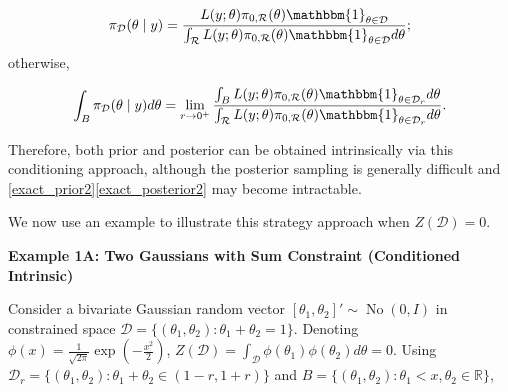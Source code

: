\documentclass[10pt]{article}
\newcommand{\mc}[1]{\mathcal{#1}}
\DeclareMathOperator{\No}{No}
\DeclareMathOperator{\1}{\mathbbm{1}}
\begin{document}
\begin{equation}
\label{exact_posterior1}
	{\pi}_{\mc D}(\theta \mid y) = \frac{ L(y;\theta)\pi_{0,\mc R}(\theta)\mathbbm{1}_{\theta\in \mc D} }{ \int_{\mc R} L(y;\theta)\pi_{0,\mc R}(\theta) \mathbbm{1}_{\theta\in \mc D}d\theta };
\end{equation}
otherwise,

\begin{equation}
\label{exact_posterior2}
	\int_{B} {\pi}_{\mc D}(\theta \mid y) d\theta = \lim_{r\rightarrow 0^+}  \frac{ \int_{B}  L(y;\theta)\pi_{0,\mc R}(\theta)\mathbbm{1}_{\theta\in \mc D_r}  d\theta }{ \int_{\mc R} L(y;\theta)\pi_{0,\mc R}(\theta) \mathbbm{1}_{\theta\in \mc D_r}d\theta }.
\end{equation}

Therefore, both prior and posterior can be obtained intrinsically via this conditioning approach, although the posterior sampling is generally difficult and \eqref{exact_prior2}\eqref{exact_posterior2} may become intractable.

We now use an example to illustrate this strategy approach when $Z(\mc D)=0$.

{\bf Example 1A: Two Gaussians with Sum Constraint (Conditioned Intrinsic)}

Consider a bivariate Gaussian random vector $[\theta_1,\theta_2]' \sim \No(0,I)$ in constrained space $\mc D=\{(\theta_1,\theta_2):\theta_1+\theta_2=1\}$. Denoting $\phi(x)= \frac{1}{\sqrt{2\pi}} \exp(-\frac{x^2}{2})$, $Z(\mc D)=\int_{\mc D} \phi(\theta_1)\phi(\theta_2)d\theta =0$. Using $\mc D_r=\{(\theta_1,\theta_2):\theta_1+\theta_2 \in (1-r, 1+r)\}$ and $B= \{(\theta_1,\theta_2): \theta_1< x, \theta_2\in \mathbb R\}$,
\end{document}
